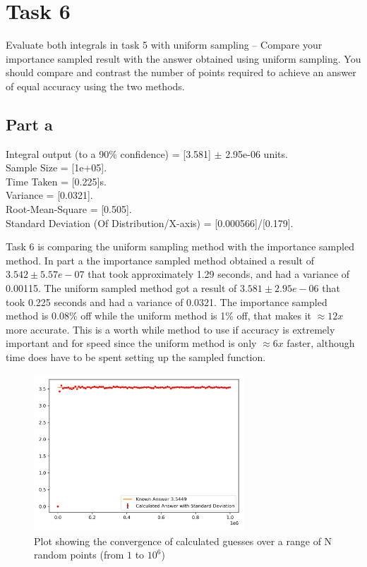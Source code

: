 \documentclass[12pt, A4]{article}
\begin{document}
\section{Task 6} %
\label{sec:Task 6}

Evaluate both integrals in task 5 with uniform sampling – Compare
your importance sampled result with the answer obtained using
uniform sampling. You should compare and contrast the number of
points required to achieve an answer of equal accuracy using the
two methods.

\subsection{Part a} %
\label{sub:6Part a}

Integral output (to a 90\% confidence) = [3.581] $\pm$  2.95e-06 units.
\\
Sample Size = [1e+05].
\\
Time Taken = [0.225]s.
\\
Variance = [0.0321].
\\
Root-Mean-Square = [0.505].
\\
Standard Deviation (Of Distribution/X-axis) = [0.000566]/[0.179]. 

\vspace{1em}

Task 6 is comparing the uniform sampling method with the importance sampled method. 
In part a the importance sampled method obtained a result of $3.542 \pm 5.57e-07$ that took 
approximately 1.29 seconds, and had a variance of 0.00115. The uniform sampled method got a result 
of $3.581 \pm 2.95e-06$ that took 0.225 seconds and had a variance of 0.0321. The importance sampled 
method is 0.08\% off while the uniform method is 1\% off, that makes it $\approx 12x$ more accurate. 
This is a worth while method to use if accuracy is extremely important and for speed since the 
uniform method is only $\approx 6x$ faster, although time does have to be spent 
setting up the sampled function.

\begin{figure}[H]
  \begin{center}
    \includegraphics[width=0.7\textwidth]{task_6_a.png}
  \end{center}
  \caption{Plot showing the convergence of calculated guesses over a range of N random points (from $1$ to $10^6$)}
  \label{fig:task_6_a}
\end{figure}
\end{document}
